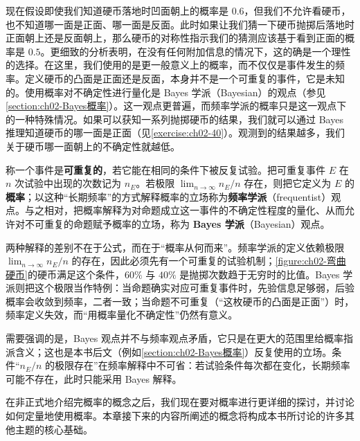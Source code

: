 \documentclass[../main.tex]{subfiles}
\begin{document}
现在假设即使我们知道硬币落地时凹面朝上的概率是 $0.6$，但我们不允许看硬币，也不知道哪一面是正面、哪一面是反面。此时如果让我们猜一下硬币抛掷后落地时正面朝上还是反面朝上，那么硬币的对称性指示我们的猜测应该基于看到正面的概率是 $0.5$。更细致的分析表明，在没有任何附加信息的情况下，这的确是一个理性的选择。在这里，我们使用的是更一般意义上的概率，而不仅仅是事件发生的频率。定义硬币的凸面是正面还是反面，本身并不是一个可重复的事件，它是未知的。使用概率对不确定性进行量化是 Bayes 学派（Bayesian）的观点（参见\cref{section:ch02-Bayes概率}）。这一观点更普遍，而频率学派的概率只是这一观点下的一种特殊情况。如果可以获知一系列抛掷硬币的结果，我们就可以通过 Bayes 推理知道硬币的哪一面是正面（见\cref{exercise:ch02-40}）。观测到的结果越多，我们关于硬币哪一面朝上的不确定性就越低。

\begin{definition}\label{definition:ch02-概率的两种解释}
称一个事件是\textbf{可重复的}，若它能在相同的条件下被反复试验。把可重复事件 $E$ 在 $n$ 次试验中出现的次数记为 $n_E$。若极限 $\lim_{n\to\infty} n_E/n$ 存在，则把它定义为 $E$ 的\textbf{概率}；以这种“长期频率”的方式解释概率的立场称为\textbf{频率学派}（frequentist）观点。与之相对，把概率解释为对命题成立这一事件的不确定性程度的量化、从而允许对不可重复的命题赋予概率的立场，称为 \textbf{Bayes 学派}（Bayesian）观点。
\end{definition}

\begin{remark}
两种解释的差别不在于公式，而在于“概率从何而来”。频率学派的定义依赖极限 $\lim_{n\to\infty}n_E/n$ 的存在，因此必须先有一个可重复的试验机制；\cref{figure:ch02-弯曲硬币}的硬币满足这个条件，$60\%$ 与 $40\%$ 是抛掷次数趋于无穷时的比值。Bayes 学派则把这个极限当作特例：当命题确实对应可重复事件时，先验信息足够弱，后验概率会收敛到频率，二者一致；当命题不可重复（“这枚硬币的凸面是正面”）时，频率定义失效，而“用概率量化不确定性”仍然有意义。

需要强调的是，Bayes 观点并不与频率观点矛盾，它只是在更大的范围里给概率指派含义；这也是本书后文（例如\cref{section:ch02-Bayes概率}）反复使用的立场。条件“$n_E/n$ 的极限存在”在频率解释中不可省：若试验条件每次都在变化，长期频率可能不存在，此时只能采用 Bayes 解释。
\end{remark}

在非正式地介绍完概率的概念之后，我们现在要对概率进行更详细的探讨，并讨论如何定量地使用概率。本章接下来的内容所阐述的概念将构成本书所讨论的许多其他主题的核心基础。








\end{document}
